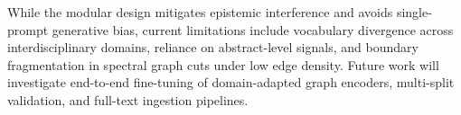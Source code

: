\documentclass[conference]{IEEEtran}
\begin{document}
While the modular design mitigates epistemic interference and avoids single-prompt
generative bias, current limitations include vocabulary divergence across
interdisciplinary domains, reliance on abstract-level signals, and boundary
fragmentation in spectral graph cuts under low edge density. Future work will
investigate end-to-end fine-tuning of domain-adapted graph encoders, multi-split
validation, and full-text ingestion pipelines.

%   
%   
\end{document}

